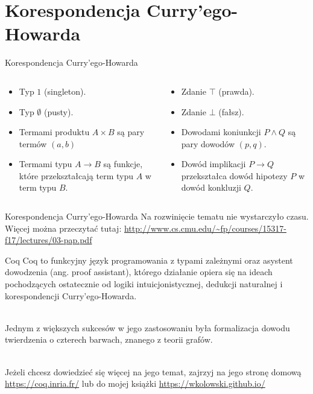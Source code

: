 \documentclass{beamer}
\newcommand{\impl}{\rightarrow}
\begin{document}
\section{Korespondencja Curry'ego-Howarda}

\begin{frame}{Korespondencja Curry'ego-Howarda}

\begin{columns}
\begin{column}{0.5\textwidth}
\begin{itemize}
	\item Typ $1$ (singleton).
	\item Typ $\emptyset$ (pusty).
	\item Termami produktu $A \times B$ są pary termów $(a, b)$
	\item Termami typu $A \to B$ są funkcje, które przekształcają term typu $A$ w term typu $B$.
\end{itemize}
\end{column}
\begin{column}{0.5\textwidth}
\begin{itemize}
	\item Zdanie $\top$ (prawda).
	\item Zdanie $\bot$ (fałsz).
	\item Dowodami koniunkcji $P \land Q$ są pary dowodów $(p, q)$.
	\item Dowód implikacji $P \impl Q$ przekształca dowód hipotezy $P$ w dowód konkluzji $Q$. 
\end{itemize}
\end{column}
\end{columns}
\end{frame}

\begin{frame}{Korespondencja Curry'ego-Howarda}
	Na rozwinięcie tematu nie wystarczyło czasu. Więcej można przeczytać tutaj: \url{http://www.cs.cmu.edu/~fp/courses/15317-f17/lectures/03-pap.pdf}
\end{frame}

\begin{frame}{Coq}
	Coq to funkcyjny język programowania z typami zależnymi oraz asystent dowodzenia (ang. proof assistant), którego działanie opiera się na ideach pochodzących ostatecznie od logiki intuicjonistycznej, dedukcji naturalnej i korespondencji Curry'ego-Howarda. \\~\
	
	Jednym z większych sukcesów w jego zastosowaniu była formalizacja dowodu twierdzenia o czterech barwach, znanego z teorii grafów. \\~\
	
	Jeżeli chcesz dowiedzieć się więcej na jego temat, zajrzyj na jego stronę domową \url{https://coq.inria.fr/} lub do mojej książki \url{https://wkolowski.github.io/}
\end{frame}
\end{document}
